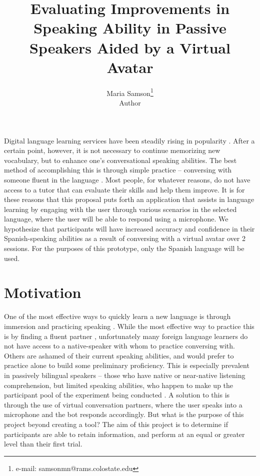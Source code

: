 \documentclass{vgtc}                          %
\title{Evaluating Improvements in Speaking Ability in Passive Speakers Aided by a Virtual Avatar}
\author{Maria Samson\thanks{e-mail: samsonmn@rams.colostate.edu}\\ %
        \scriptsize Author}
\begin{document}


\maketitle

Digital language learning services have been steadily rising in popularity \cite{Sung:2015}.
After a certain point, however, it is not necessary to continue memorizing new vocabulary, but to enhance one’s conversational speaking abilities.
The best method of accomplishing this is through simple practice – conversing with someone fluent in the language \cite{Burger:2015}.
Most people, for whatever reasons, do not have access to a tutor that can evaluate their skills and help them improve.
It is for these reasons that this proposal puts forth an application that assists in language learning by engaging with the user through various scenarios in the selected language, where the user will be able to respond using a microphone.
We hypothesize that participants will have increased accuracy and confidence in their Spanish-speaking abilities as a result of conversing with a virtual avatar over 2 sessions.
For the purposes of this prototype, only the Spanish language will be used.



\section{Motivation}
One of the most effective ways to quickly learn a new language is through immersion and practicing speaking \cite{Burger:2015}.
While the most effective way to practice this is by finding a fluent partner \cite{Emde:2002}, unfortunately many foreign language learners do not have access to a native-speaker with whom to practice conversing with.
Others are ashamed of their current speaking abilities, and would prefer to practice alone to build some preliminary proficiency.
This is especially prevalent in passively bilingual speakers -- those who have native or near-native listening comprehension, but limited speaking abilities, who happen to make up the participant pool of the experiment being conducted \cite{Chumak:2008}.
A solution to this is through the use of virtual conversation partners, where the user speaks into a microphone and the bot responds accordingly.
But what is the purpose of this project beyond creating a tool?
The aim of this project is to determine if participants are able to retain information, and perform at an equal or greater level than their first trial.
\end{document}
